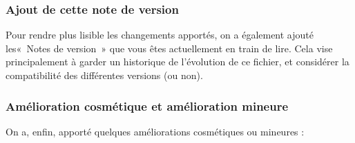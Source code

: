 \subsubsection{Ajout de cette note de version}

Pour rendre plus lisible les changements apportés, on a également ajouté les«~Notes de version~» que vous êtes actuellement en train de lire. Cela vise principalement à garder un historique de l'évolution de ce fichier, et considérer la compatibilité des différentes versions (ou non).

\subsubsection{Amélioration cosmétique et amélioration mineure}

On a, enfin, apporté quelques améliorations cosmétiques ou mineures :

